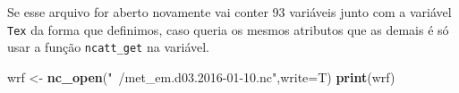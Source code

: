 \documentclass[]{book}
\newenvironment{Shaded}{\begin{snugshade}}{\end{snugshade}}
\newcommand{\KeywordTok}[1]{\textcolor[rgb]{0.13,0.29,0.53}{\textbf{#1}}}
\newcommand{\DataTypeTok}[1]{\textcolor[rgb]{0.13,0.29,0.53}{#1}}
\newcommand{\DecValTok}[1]{\textcolor[rgb]{0.00,0.00,0.81}{#1}}
\newcommand{\StringTok}[1]{\textcolor[rgb]{0.31,0.60,0.02}{#1}}
\newcommand{\OtherTok}[1]{\textcolor[rgb]{0.56,0.35,0.01}{#1}}
\newcommand{\OperatorTok}[1]{\textcolor[rgb]{0.81,0.36,0.00}{\textbf{#1}}}
\newcommand{\NormalTok}[1]{#1}
\begin{document}
\begin{Shaded}
\end{Shaded}

Se esse arquivo for aberto novamente vai conter 93 variáveis junto com a
variável \texttt{Tex} da forma que definimos, caso queria os mesmos
atributos que as demais é só usar a função \texttt{ncatt\_get} na
variável.

\begin{Shaded}
\begin{Highlighting}[]
\NormalTok{wrf     <-}\StringTok{ }\KeywordTok{nc_open}\NormalTok{(}\StringTok{"~/met_em.d03.2016-01-10.nc"}\NormalTok{,}\DataTypeTok{write=}\NormalTok{T)}
\KeywordTok{print}\NormalTok{(wrf)}
\end{Highlighting}
\end{Shaded}
\end{document}
